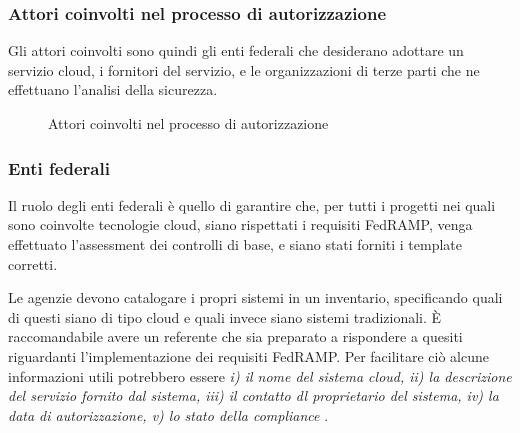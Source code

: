 \documentclass[../main.tex]{subfiles}
\begin{document}
\vfill
\subsubsection{Attori coinvolti nel processo di autorizzazione}
Gli attori coinvolti sono quindi gli enti federali che desiderano adottare un servizio cloud, i fornitori del servizio, e le organizzazioni di terze parti che ne effettuano l'analisi della sicurezza.

\begin{figure}[H]
\centering
{}
\caption{Attori coinvolti nel processo di autorizzazione \cite{understandingFedRAMP} }\label{fig:fedrampactors}
\end{figure}



\subsubsection{Enti federali}
Il ruolo degli enti federali è quello di garantire che, per tutti i progetti nei quali sono coinvolte tecnologie cloud, siano rispettati i requisiti FedRAMP, venga effettuato l'assessment dei controlli di base, e siano stati forniti i template corretti.


Le agenzie devono catalogare i propri sistemi in un inventario, specificando quali di questi siano di tipo cloud e quali invece siano sistemi tradizionali. È raccomandabile avere un referente che sia preparato a rispondere a quesiti riguardanti l'implementazione dei requisiti FedRAMP.
Per facilitare ciò alcune informazioni utili potrebbero essere \textit{i) il nome del sistema cloud, ii) la descrizione del servizio fornito dal sistema, iii) il contatto dl proprietario del sistema, iv) la data di autorizzazione, v) lo stato della compliance} \cite{fedrampFramework}.
\end{document}
